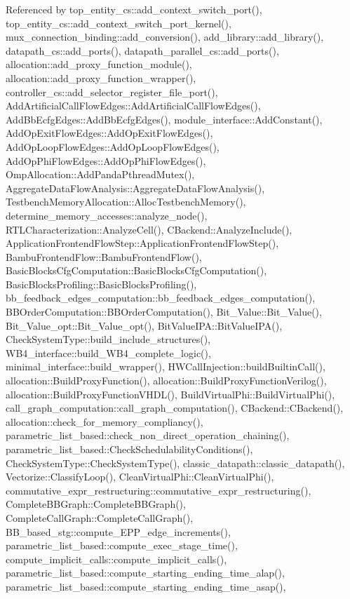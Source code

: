 Referenced by top\+\_\+entity\+\_\+cs\+::add\+\_\+context\+\_\+switch\+\_\+port(), top\+\_\+entity\+\_\+cs\+::add\+\_\+context\+\_\+switch\+\_\+port\+\_\+kernel(), mux\+\_\+connection\+\_\+binding\+::add\+\_\+conversion(), add\+\_\+library\+::add\+\_\+library(), datapath\+\_\+cs\+::add\+\_\+ports(), datapath\+\_\+parallel\+\_\+cs\+::add\+\_\+ports(), allocation\+::add\+\_\+proxy\+\_\+function\+\_\+module(), allocation\+::add\+\_\+proxy\+\_\+function\+\_\+wrapper(), controller\+\_\+cs\+::add\+\_\+selector\+\_\+register\+\_\+file\+\_\+port(), Add\+Artificial\+Call\+Flow\+Edges\+::\+Add\+Artificial\+Call\+Flow\+Edges(), Add\+Bb\+Ecfg\+Edges\+::\+Add\+Bb\+Ecfg\+Edges(), module\+\_\+interface\+::\+Add\+Constant(), Add\+Op\+Exit\+Flow\+Edges\+::\+Add\+Op\+Exit\+Flow\+Edges(), Add\+Op\+Loop\+Flow\+Edges\+::\+Add\+Op\+Loop\+Flow\+Edges(), Add\+Op\+Phi\+Flow\+Edges\+::\+Add\+Op\+Phi\+Flow\+Edges(), Omp\+Allocation\+::\+Add\+Panda\+Pthread\+Mutex(), Aggregate\+Data\+Flow\+Analysis\+::\+Aggregate\+Data\+Flow\+Analysis(), Testbench\+Memory\+Allocation\+::\+Alloc\+Testbench\+Memory(), determine\+\_\+memory\+\_\+accesses\+::analyze\+\_\+node(), R\+T\+L\+Characterization\+::\+Analyze\+Cell(), C\+Backend\+::\+Analyze\+Include(), Application\+Frontend\+Flow\+Step\+::\+Application\+Frontend\+Flow\+Step(), Bambu\+Frontend\+Flow\+::\+Bambu\+Frontend\+Flow(), Basic\+Blocks\+Cfg\+Computation\+::\+Basic\+Blocks\+Cfg\+Computation(), Basic\+Blocks\+Profiling\+::\+Basic\+Blocks\+Profiling(), bb\+\_\+feedback\+\_\+edges\+\_\+computation\+::bb\+\_\+feedback\+\_\+edges\+\_\+computation(), B\+B\+Order\+Computation\+::\+B\+B\+Order\+Computation(), Bit\+\_\+\+Value\+::\+Bit\+\_\+\+Value(), Bit\+\_\+\+Value\+\_\+opt\+::\+Bit\+\_\+\+Value\+\_\+opt(), Bit\+Value\+I\+P\+A\+::\+Bit\+Value\+I\+P\+A(), Check\+System\+Type\+::build\+\_\+include\+\_\+structures(), W\+B4\+\_\+interface\+::build\+\_\+\+W\+B4\+\_\+complete\+\_\+logic(), minimal\+\_\+interface\+::build\+\_\+wrapper(), H\+W\+Call\+Injection\+::build\+Builtin\+Call(), allocation\+::\+Build\+Proxy\+Function(), allocation\+::\+Build\+Proxy\+Function\+Verilog(), allocation\+::\+Build\+Proxy\+Function\+V\+H\+D\+L(), Build\+Virtual\+Phi\+::\+Build\+Virtual\+Phi(), call\+\_\+graph\+\_\+computation\+::call\+\_\+graph\+\_\+computation(), C\+Backend\+::\+C\+Backend(), allocation\+::check\+\_\+for\+\_\+memory\+\_\+compliancy(), parametric\+\_\+list\+\_\+based\+::check\+\_\+non\+\_\+direct\+\_\+operation\+\_\+chaining(), parametric\+\_\+list\+\_\+based\+::\+Check\+Schedulability\+Conditions(), Check\+System\+Type\+::\+Check\+System\+Type(), classic\+\_\+datapath\+::classic\+\_\+datapath(), Vectorize\+::\+Classify\+Loop(), Clean\+Virtual\+Phi\+::\+Clean\+Virtual\+Phi(), commutative\+\_\+expr\+\_\+restructuring\+::commutative\+\_\+expr\+\_\+restructuring(), Complete\+B\+B\+Graph\+::\+Complete\+B\+B\+Graph(), Complete\+Call\+Graph\+::\+Complete\+Call\+Graph(), B\+B\+\_\+based\+\_\+stg\+::compute\+\_\+\+E\+P\+P\+\_\+edge\+\_\+increments(), parametric\+\_\+list\+\_\+based\+::compute\+\_\+exec\+\_\+stage\+\_\+time(), compute\+\_\+implicit\+\_\+calls\+::compute\+\_\+implicit\+\_\+calls(), parametric\+\_\+list\+\_\+based\+::compute\+\_\+starting\+\_\+ending\+\_\+time\+\_\+alap(), parametric\+\_\+list\+\_\+based\+::compute\+\_\+starting\+\_\+ending\+\_\+time\+\_\+asap(), 